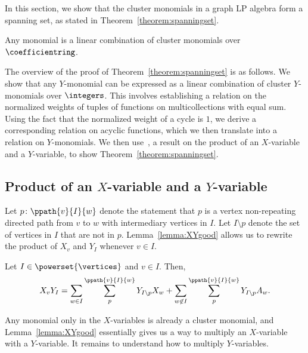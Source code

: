 In this section, we show that the cluster monomials in a graph LP algebra form a spanning set, as stated in Theorem~\ref{theorem:spanningset}.

\begin{theo} \label{theorem:spanningset}
    Any monomial is a linear combination of cluster monomials over \(\coefficientring\).
\end{theo}

The overview of the proof of Theorem~\ref{theorem:spanningset} is as follows.
We show that any \(Y\)-monomial can be expressed as a linear combination of cluster \(Y\)-monomials over \(\integers\).
This involves establishing a relation on the normalized weights of tuples of functions on multicollections with equal sum.
Using the fact that the normalized weight of a cycle is \(1\),
we derive a corresponding relation on acyclic functions,
which we then translate into a relation on \(Y\)-monomials.
We then use~\cite[Lemma~4.7]{linearLP}, a result on the product of an \(X\)-variable and a \(Y\)-variable, to show Theorem~\ref{theorem:spanningset}.

\subsection{Product of an \texorpdfstring{\(X\)}{X}-variable and a \texorpdfstring{\(Y\)}{Y}-variable} \label{subsection:productXY}

Let \(p \colon \ppath{v}{I}{w}\) denote the statement that \(p\) is a vertex non-repeating directed path from \(v\) to \(w\) with intermediary vertices in \(I\).
Let \(I \setminus p\) denote the set of vertices in \(I\) that are not in \(p\).
Lemma~\ref{lemma:XYgood} allows us to rewrite the product of \(X_v\) and \(Y_I\) whenever \(v \in I\).

\begin{lemm} \label{lemma:XYgood}
Let \(I \in \powerset{\vertices}\) and \(v \in I\).
Then,
\begin{equation*} \label{ppathsequation}
    X_v Y_I =
    \sum_{w \in I}
    \sum_{p}^{\ppath{v}{I}{w}}
    Y_{I \setminus p}  X_w
    +
    \sum_{w \not\in I}
    \sum_{p}^{\ppath{v}{I}{w}}
    Y_{I \setminus p}  A_w.
\end{equation*}
\end{lemm}

Any monomial only in the \(X\)-variables is already a cluster monomial, and Lemma~\ref{lemma:XYgood} essentially gives us a way to multiply an \(X\)-variable with a \(Y\)-variable.
It remains to understand how to multiply \(Y\)-variables. 

